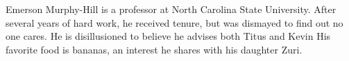 \documentclass[conference]{IEEEtran}
\begin{document}
Emerson Murphy-Hill is a professor at North Carolina State University.  After several years of hard work, he received tenure, but was dismayed to find out no one cares.  He is disillusioned to believe he advises both Titus and Kevin His favorite food is bananas, an interest he shares with his daughter Zuri.



\end{document}
